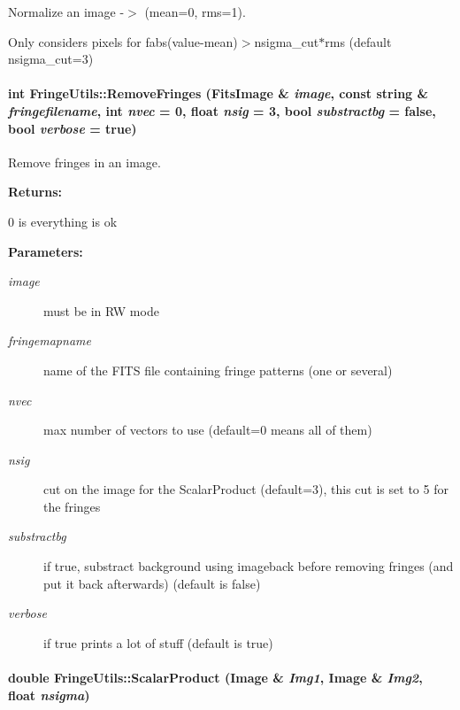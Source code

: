 Normalize an image -$>$ (mean=0, rms=1).

Only considers pixels for fabs(value-mean)$>$nsigma\_\-cut$\ast$rms (default nsigma\_\-cut=3) 
\paragraph{\setlength{\rightskip}{0pt plus 5cm}int Fringe\-Utils::Remove\-Fringes ({\bf Fits\-Image} \& {\em image}, const string \& {\em fringefilename}, int {\em nvec} = 0, float {\em nsig} = 3, bool {\em substractbg} = false, bool {\em verbose} = true)\hspace{0.3cm}{\tt  [static]}}\hfill\label{class_fringeutils_d9}


Remove fringes in an image.

\begin{Desc}
\item[{\bf Returns: }]\par
0 is everything is ok \end{Desc}
\begin{Desc}
\item[{\bf Parameters: }]\par
\begin{description}
\item[
{\em image}]must be in RW mode \item[
{\em fringemapname}]name of the FITS file containing fringe patterns (one or several) \item[
{\em nvec}]max number of vectors to use (default=0 means all of them) \item[
{\em nsig}]cut on the image for the Scalar\-Product (default=3), this cut is set to 5 for the fringes \item[
{\em substractbg}]if true, substract background using imageback before removing fringes  (and put it back afterwards) (default is false) \item[
{\em verbose}]if true prints a lot of stuff (default is true) \end{description}
\end{Desc}
\paragraph{\setlength{\rightskip}{0pt plus 5cm}double Fringe\-Utils::Scalar\-Product ({\bf Image} \& {\em Img1}, {\bf Image} \& {\em Img2}, float {\em nsigma})\hspace{0.3cm}{\tt  [static]}}\hfill\label{class_fringeutils_d1}


